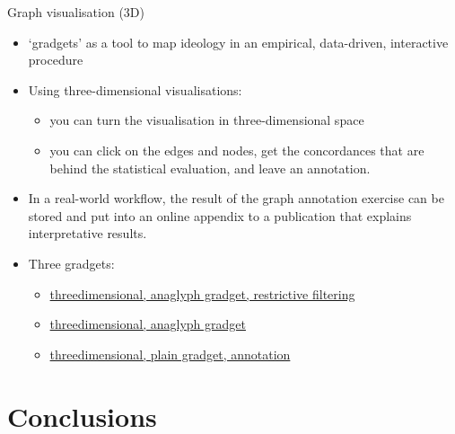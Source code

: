 \documentclass[
  ignorenonframetext,
]{beamer}
\providecommand{\tightlist}{%
  \setlength{\itemsep}{0pt}\setlength{\parskip}{0pt}}
\begin{document}
\begin{frame}{Graph visualisation (3D)}
\protect\hypertarget{graph-visualisation-3d}{}

\begin{itemize}
\item
  `gradgets' as a tool to map ideology in an empirical, data-driven,
  interactive procedure
\item
  Using three-dimensional visualisations:

  \begin{itemize}
  \tightlist
  \item
    you can turn the visualisation in three-dimensional space
  \item
    you can click on the edges and nodes, get the concordances that are
    behind the statistical evaluation, and leave an annotation.
  \end{itemize}
\item
  In a real-world workflow, the result of the graph annotation exercise
  can be stored and put into an online appendix to a publication that
  explains interpretative results.
\item
  Three gradgets:

  \begin{itemize}
  \tightlist
  \item
    \href{widget_3.html}{threedimensional, anaglyph gradget, restrictive
    filtering}
  \item
    \href{widget_2.html}{threedimensional, anaglyph gradget}
  \item
    \href{widget_1.html}{threedimensional, plain gradget, annotation}
  \end{itemize}
\end{itemize}

\end{frame}

\hypertarget{conclusions}{%
\section{Conclusions}\label{conclusions}}
\end{document}
